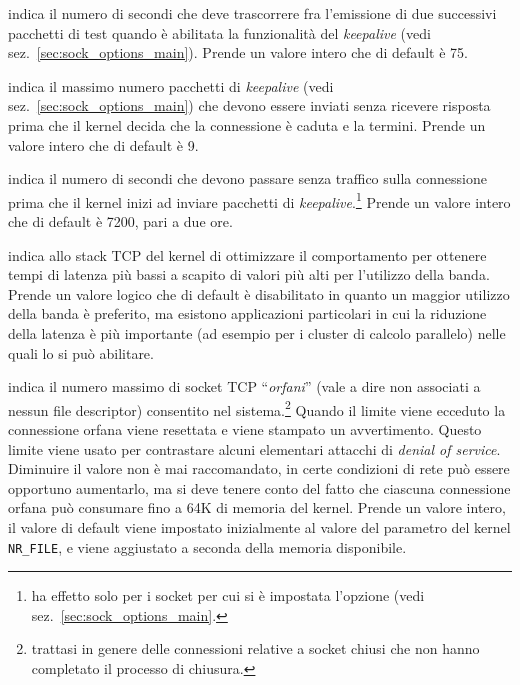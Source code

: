 \begin{basedescript}{\desclabelwidth{2.2cm}\desclabelstyle{\nextlinelabel}}
\item[\sysctlrelfiled{net/ipv4}{tcp\_keepalive\_intvl}] indica il
  numero di secondi che deve trascorrere fra l'emissione di due successivi
  pacchetti di test quando è abilitata la funzionalità del \textit{keepalive}
  (vedi sez.~\ref{sec:sock_options_main}). Prende un valore intero che di
  default è 75.

\item[\sysctlrelfiled{net/ipv4}{tcp\_keepalive\_probes}] indica il
  massimo numero pacchetti di \textit{keepalive} (vedi
  sez.~\ref{sec:sock_options_main}) che devono essere inviati senza ricevere
  risposta prima che il kernel decida che la connessione è caduta e la
  termini. Prende un valore intero che di default è 9.

\item[\sysctlrelfiled{net/ipv4}{tcp\_keepalive\_time}] indica il numero di
  secondi che devono passare senza traffico sulla connessione prima che il
  kernel inizi ad inviare pacchetti di \textit{keepalive}.\footnote{ha effetto
    solo per i socket per cui si è impostata l'opzione 
    (vedi sez.~\ref{sec:sock_options_main}.}  Prende un valore intero che di
  default è 7200, pari a due ore.

\item[\sysctlrelfiled{net/ipv4}{tcp\_low\_latency}] indica allo stack
  TCP del kernel di ottimizzare il comportamento per ottenere tempi di latenza
  più bassi a scapito di valori più alti per l'utilizzo della banda. Prende un
  valore logico che di default è disabilitato in quanto un maggior utilizzo
  della banda è preferito, ma esistono applicazioni particolari in cui la
  riduzione della latenza è più importante (ad esempio per i cluster di
  calcolo parallelo) nelle quali lo si può abilitare.

\item[\sysctlrelfiled{net/ipv4}{tcp\_max\_orphans}] indica il numero
  massimo di socket TCP ``\textsl{orfani}'' (vale a dire non associati a
  nessun file descriptor) consentito nel sistema.\footnote{trattasi in genere
    delle connessioni relative a socket chiusi che non hanno completato il
    processo di chiusura.}  Quando il limite viene ecceduto la connessione
  orfana viene resettata e viene stampato un avvertimento. Questo limite viene
  usato per contrastare alcuni elementari attacchi di \textit{denial of
    service}.  Diminuire il valore non è mai raccomandato, in certe condizioni
  di rete può essere opportuno aumentarlo, ma si deve tenere conto del fatto
  che ciascuna connessione orfana può consumare fino a 64K di memoria del
  kernel. Prende un valore intero, il valore di default viene impostato
  inizialmente al valore del parametro del kernel \texttt{NR\_FILE}, e viene
  aggiustato a seconda della memoria disponibile.


\end{basedescript}
